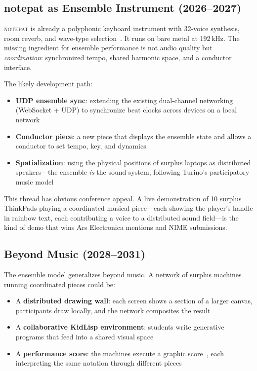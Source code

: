 \documentclass[10pt,letterpaper,twocolumn]{article}
\newcommand{\np}{\textsc{notepat}}
\begin{document}
\subsection{notepat as Ensemble Instrument (2026--2027)}

\np{} is already a polyphonic keyboard instrument with 32-voice synthesis, room reverb, and wave-type selection~\citep{scudder2026notepat}. It runs on bare metal at 192\,kHz. The missing ingredient for ensemble performance is not audio quality but \emph{coordination}: synchronized tempo, shared harmonic space, and a conductor interface.

The likely development path:

\begin{itemize}
  \item \textbf{UDP ensemble sync}: extending the existing dual-channel networking (WebSocket + UDP) to synchronize beat clocks across devices on a local network
  \item \textbf{Conductor piece}: a new piece that displays the ensemble state and allows a conductor to set tempo, key, and dynamics
  \item \textbf{Spatialization}: using the physical positions of surplus laptops as distributed speakers---the ensemble \emph{is} the sound system, following Turino's participatory music model~\citep{turino2008music}
\end{itemize}

This thread has obvious conference appeal. A live demonstration of 10 surplus ThinkPads playing a coordinated musical piece---each showing the player's handle in rainbow text, each contributing a voice to a distributed sound field---is the kind of demo that wins Ars Electronica mentions and NIME submissions.

\subsection{Beyond Music (2028--2031)}

The ensemble model generalizes beyond music. A network of surplus machines running coordinated pieces could be:

\begin{itemize}
  \item A \textbf{distributed drawing wall}: each screen shows a section of a larger canvas, participants draw locally, and the network composites the result
  \item A \textbf{collaborative KidLisp environment}: students write generative programs that feed into a shared visual space
  \item A \textbf{performance score}: the machines execute a graphic score~\citep{scudder2026pieces}, each interpreting the same notation through different pieces
\end{itemize}
\end{document}
